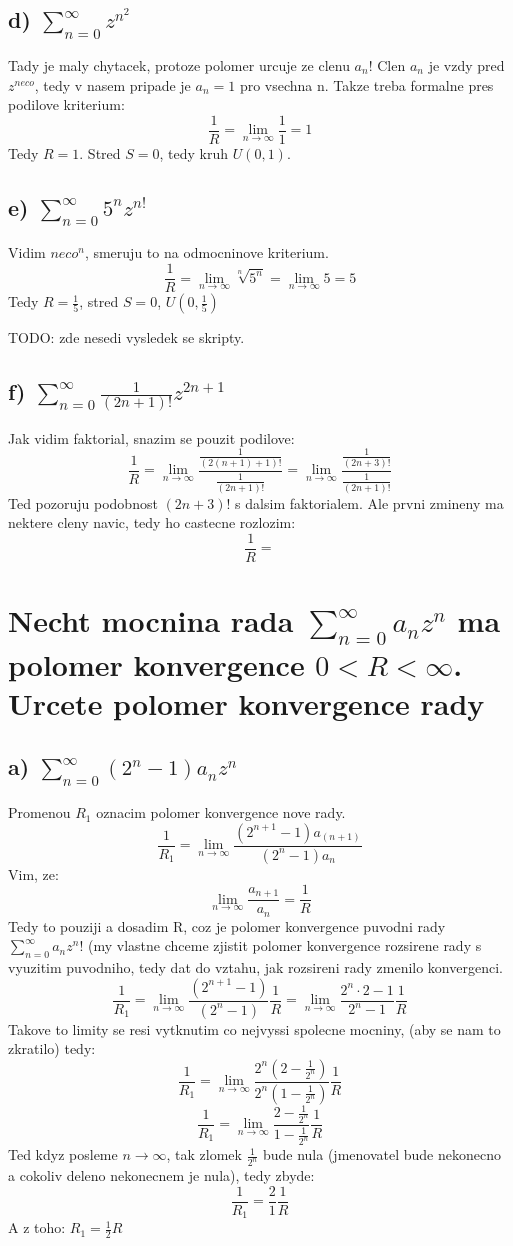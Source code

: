 \subsection{d) $\sum_{n=0}^\infty z^{n^2}$}
Tady je maly chytacek, protoze polomer urcuje ze clenu $a_n$! Clen $a_n$ je vzdy pred $z^{neco}$, tedy v nasem pripade je $a_n = 1$ pro vsechna n. Takze treba formalne pres podilove kriterium:
$$\frac{1}{R} = \lim_{n \to \infty} \frac{1}{1} = 1$$
Tedy $R=1$. Stred $S=0$, tedy kruh $U(0,1)$.

\subsection{e) $\sum_{n=0}^\infty 5^n z^{n!}$}
Vidim $neco^n$, smeruju to na odmocninove kriterium.
$$\frac{1}{R} = \lim_{n \to \infty} \sqrt[n]{5^n} = \lim_{n \to \infty} 5 =5$$
Tedy $R=\frac{1}{5}$, stred $S=0$, $U(0,\frac{1}{5})$

TODO: zde nesedi vysledek se skripty.

\subsection{f) $\sum_{n=0}^\infty \frac{1}{(2n+1)!}z^{2n+1}$}
Jak vidim faktorial, snazim se pouzit podilove:
$$\frac{1}{R} = \lim_{n \to \infty} \frac{\frac{1}{(2(n+1)+1)!}}{\frac{1}{(2n+1)!}} = \lim_{n \to \infty} \frac{\frac{1}{(2n+3)!}}{\frac{1}{(2n+1)!}}$$
Ted pozoruju podobnost $(2n+3)!$ s dalsim faktorialem. Ale prvni zmineny ma nektere cleny navic, tedy ho castecne rozlozim:
$$\frac{1}{R} = $$


\section{Necht mocnina rada $\sum_{n=0}^\infty a_n z^n$ ma polomer konvergence $0< R <\infty$. Urcete polomer konvergence rady}
\subsection*{a) $\sum_{n=0}^\infty (2^n-1)a_n z^n$}
Promenou $R_1$ oznacim polomer konvergence nove rady.
$$\frac{1}{R_1} = \lim_{n \to \infty} \frac{(2^{n+1}-1) a_{(n+1)}}{(2^n-1)a_n}$$
Vim, ze:
$$\lim_{n \to \infty} \frac{a_{n+1}}{a_n} = \frac{1}{R}$$
Tedy to pouziji a dosadim R, coz je polomer konvergence puvodni rady $\sum_{n=0}^\infty a_n z^n$!
(my vlastne chceme zjistit polomer konvergence rozsirene rady s vyuzitim puvodniho, tedy dat do vztahu, jak rozsireni rady zmenilo konvergenci.
$$\frac{1}{R_1} = \lim_{n \to \infty} \frac{(2^{n+1}-1)}{(2^n-1)}\frac{1}{R} =  \lim_{n \to \infty} \frac{2^n\cdot 2 - 1}{2^n -1} \frac{1}{R}$$
Takove to limity se resi vytknutim co nejvyssi spolecne mocniny, (aby se nam to zkratilo) tedy:
$$\frac{1}{R_1} = \lim_{n \to \infty} \frac{2^n (2-\frac{1}{2^n})}{2^n (1 - \frac{1}{2^n})} \frac{1}{R}$$
$$\frac{1}{R_1} = \lim_{n \to \infty} \frac{2-\frac{1}{2^n}}{1-\frac{1}{2^n}}\frac{1}{R}$$
Ted kdyz posleme $n \to \infty$, tak zlomek $\frac{1}{2^n}$ bude nula (jmenovatel bude nekonecno a cokoliv deleno nekonecnem je nula), tedy zbyde:
$$\frac{1}{R_1} = \frac{2}{1} \frac{1}{R}$$
A z toho:
$R_1 = \frac{1}{2} R$

